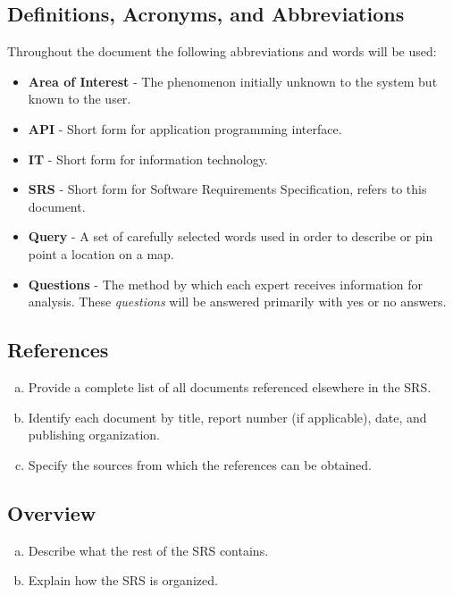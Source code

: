 \documentclass[titlepage]{article}
\begin{document}
		\subsection{Definitions, Acronyms, and Abbreviations}
		\label{sub:definitions_acronyms_and_abbreviations}
		Throughout  the document the following abbreviations and words will be used:
		\begin{itemize}
			\item \textbf{Area of Interest} - The phenomenon initially unknown to the system but known to the user.
			\item \textbf{API} - Short form for application programming interface.
			\item \textbf{IT} - Short form for information technology.
			\item \textbf{SRS} - Short form for Software Requirements Specification, refers to this document.
			\item \textbf{Query} - A set of carefully selected words used in order to describe or pin point a location on a map.
			\item \textbf{Questions} - The method by which each expert receives information for analysis. These \textit{questions} will be answered primarily with yes or no answers.
			
		\end{itemize}
		
		\subsection{References}
		\label{sub:references}
		\begin{enumerate}[a)]
			\item Provide a complete list of all documents referenced elsewhere in the SRS.
			\item Identify each document by title, report number (if applicable), date, and publishing organization.
			\item Specify the sources from which the references can be obtained.
		\end{enumerate}
		
		\subsection{Overview}
		\label{sub:overview}
		\begin{enumerate}[a)]
			\item Describe what the rest of the SRS contains.
			\item Explain how the SRS is organized.
		\end{enumerate}
		
\end{document}
